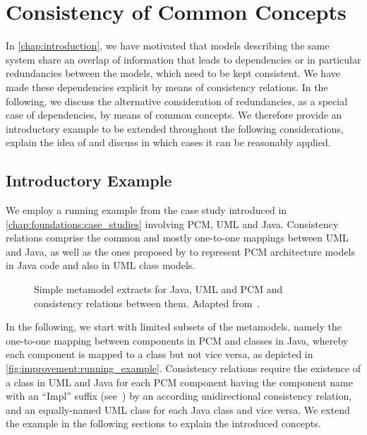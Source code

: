 \section{Consistency of Common Concepts}
\label{chap:improvement:concpets}

In \autoref{chap:introduction}, we have motivated that models describing the same system share an overlap of information that leads to dependencies or in particular redundancies between the models, which need to be kept consistent.
We have made these dependencies explicit by means of consistency relations.
In the following, we discuss the alternative consideration of redundancies, as a special case of dependencies, by means of common concepts.
We therefore provide an introductory example to be extended throughout the following considerations, explain the idea of \emph{\commonalities} and discuss in which cases it can be reasonably applied.


\subsection{Introductory Example}

We employ a running example from the case study introduced in \autoref{chap:foundations:case_studies} involving \gls{PCM}, \gls{UML} and Java.
Consistency relations comprise the common and mostly one-to-one mappings between \gls{UML} and Java, as well as the ones proposed by \textcite{langhammer2015a} to represent \gls{PCM} architecture models in Java code and also in \gls{UML} class models.

\begin{figure}
	\centering
	
	\caption[Consistency relations for extracts of Java, \acrshort{UML} and \acrshort{PCM}]{Simple metamodel extracts for Java, UML and \gls{PCM} and consistency relations between them. Adapted from~.}
	\label{fig:improvement:running_example}
\end{figure}

In the following, we start with limited subsets of the metamodels, namely the one-to-one mapping between components in \gls{PCM} and classes in Java, whereby each component is mapped to a class but not vice versa, as depicted in \autoref{fig:improvement:running_example}.
Consistency relations require the existence of a class in \gls{UML} and Java for each \gls{PCM} component having the component name with an \enquote{Impl} suffix (see~\cite{langhammer2015a}) by an according unidirectional consistency relation, and an equally-named \gls{UML} class for each Java class and vice versa.
We extend the example in the following sections to explain the introduced concepts.


